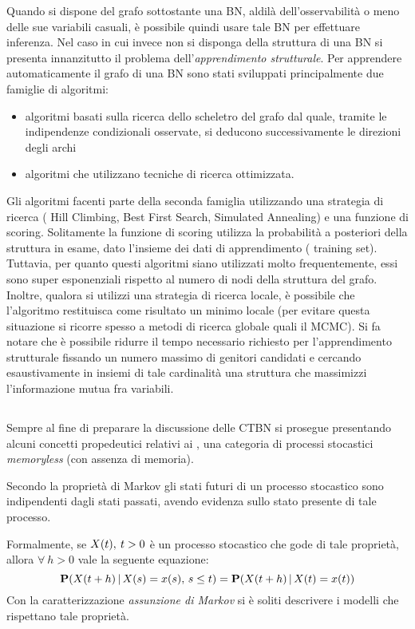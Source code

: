 Quando si dispone del grafo sottostante una \acs{BN}, aldilà dell'osservabilità o meno delle sue variabili casuali, è possibile quindi usare tale \acs{BN} per effettuare inferenza. Nel caso in cui invece non si disponga della struttura di una \acs{BN} si presenta innanzitutto il problema dell'\emph{apprendimento strutturale}. Per apprendere automaticamente il grafo di una \acl{BN} sono stati sviluppati principalmente due famiglie di algoritmi:
\begin{itemize}
    \item algoritmi basati sulla ricerca dello scheletro del grafo dal quale, tramite le indipendenze condizionali osservate, si deducono successivamente le direzioni degli archi
    \item algoritmi che utilizzano tecniche di ricerca ottimizzata.
\end{itemize}
Gli algoritmi facenti parte della seconda famiglia utilizzando una strategia di ricerca (\eg{} Hill Climbing, Best First Search, Simulated Annealing) e una funzione di scoring. Solitamente la funzione di scoring utilizza la probabilità a posteriori della struttura in esame, dato l'insieme dei dati di apprendimento (\ie{} training set). Tuttavia, per quanto questi algoritmi siano utilizzati molto frequentemente, essi sono super esponenziali rispetto al numero di nodi della struttura del grafo. Inoltre, qualora si utilizzi una strategia di ricerca locale, è possibile che l'algoritmo restituisca come risultato un minimo locale (per evitare questa situazione si ricorre spesso a metodi di ricerca globale quali il \acs{MCMC}). Si fa notare che è possibile ridurre il tempo necessario richiesto per l'apprendimento strutturale fissando un numero massimo di genitori candidati e cercando esaustivamente in insiemi di tale cardinalità una struttura che massimizzi l'informazione mutua fra variabili.

\subsection{\mprocess}
\label{sec:mps}

Sempre al fine di preparare la discussione delle \acl{CTBN} si prosegue presentando alcuni concetti propedeutici relativi ai \mprocess{}, una categoria di processi stocastici \emph{memoryless} (con assenza di memoria).

\begin{definizione}
\label{defn:markov-assumption}
Secondo la proprietà di Markov gli stati futuri di un processo stocastico sono indipendenti dagli stati passati, avendo evidenza sullo stato presente di tale processo.

Formalmente, se $\mathnormal{X}(t),\:t > 0$ è un processo stocastico che gode di tale proprietà, allora $\forall\:h > 0$ vale la seguente equazione:
\begin{equation}
\label{eq:markov-assumption}
\mathbf{P}(\mathnormal{X}(t + h)\,|\,\mathnormal{X}(s)=x(s),\,s\leq t)=\mathbf{P}(\mathnormal{X}(t + h)\,|\,\mathnormal{X}(t)=x(t))
\end{equation}
Con la caratterizzazione \emph{assunzione di Markov} si è soliti descrivere i modelli che rispettano tale proprietà.
\end{definizione}

